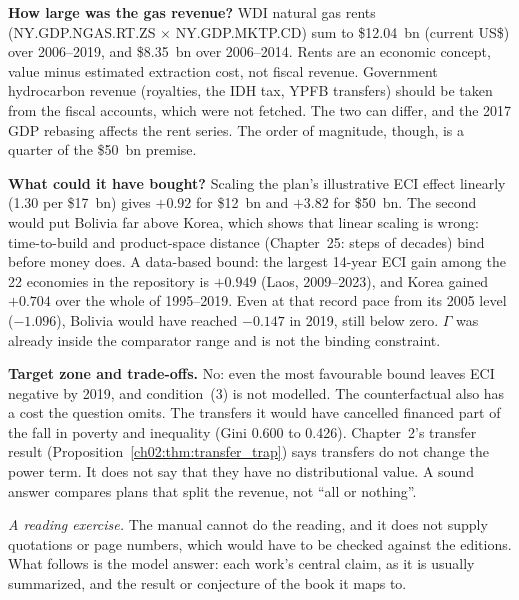 \documentclass[../solutions_manual.tex]{subfiles}
\begin{document}
 \textbf{How large was the gas revenue?} WDI natural gas rents (NY.GDP.NGAS.RT.ZS $\times$ NY.GDP.MKTP.CD) sum to \$12.04~bn (current US\$) over 2006--2019, and \$8.35~bn over 2006--2014. Rents are an economic concept, value minus estimated extraction cost, not fiscal revenue. Government hydrocarbon revenue (royalties, the IDH tax, YPFB transfers) should be taken from the fiscal accounts, which were not fetched. The two can differ, and the 2017 GDP rebasing affects the rent series. The order of magnitude, though, is a quarter of the \$50~bn premise.

 \textbf{What could it have bought?} Scaling the plan's illustrative ECI effect linearly (1.30 per \$17~bn) gives $+0.92$ for \$12~bn and $+3.82$ for \$50~bn. The second would put Bolivia far above Korea, which shows that linear scaling is wrong: time-to-build and product-space distance (Chapter~25: steps of decades) bind before money does. A data-based bound: the largest 14-year ECI gain among the 22 economies in the repository is $+0.949$ (Laos, 2009--2023), and Korea gained $+0.704$ over the whole of 1995--2019. Even at that record pace from its 2005 level ($-1.096$), Bolivia would have reached $-0.147$ in 2019, still below zero. $\Gamma$ was already inside the comparator range and is not the binding constraint.

 \textbf{Target zone and trade-offs.} No: even the most favourable bound leaves ECI negative by 2019, and condition~(3) is not modelled. The counterfactual also has a cost the question omits. The transfers it would have cancelled financed part of the fall in poverty and inequality (Gini 0.600 to 0.426). Chapter~2's transfer result (Proposition~\ref{ch02:thm:transfer_trap}) says transfers do not change the power term. It does not say that they have no distributional value. A sound answer compares plans that split the revenue, not ``all or nothing''.


\emph{A reading exercise.} The manual cannot do the reading, and it does not supply quotations or page numbers, which would have to be checked against the editions. What follows is the model answer: each work's central claim, as it is usually summarized, and the result or conjecture of the book it maps to.
\end{document}

